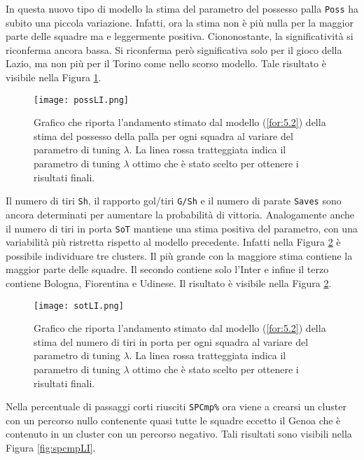 In questa nuovo tipo di modello la stima del parametro del possesso palla \texttt{Poss} ha subito una piccola variazione. Infatti, ora la stima non è più nulla per la maggior parte delle squadre ma e leggermente positiva. Ciononostante, la significatività si riconferma ancora bassa. Si riconferma però significativa solo per il gioco della Lazio, ma non più per il Torino come nello scorso modello. Tale risultato è visibile nella Figura \ref{fig:possLI}.\\
\begin{figure}[]
	\begin{center}
		\texttt{[image: possLI.png]}
		\caption{Grafico che riporta l'andamento stimato dal modello (\ref{for:5.2}) della stima del possesso della palla per ogni squadra al variare del parametro di tuning $\lambda$. La linea rossa tratteggiata indica il parametro di tuning $\lambda$ ottimo che è stato scelto per ottenere i risultati finali.} \label{fig:possLI}
	\end{center}
\end{figure}
Il numero di tiri \texttt{Sh}, il rapporto gol/tiri \texttt{G/Sh} e il numero di parate \texttt{Saves} sono ancora determinati per aumentare la probabilità di vittoria. Analogamente anche il numero di tiri in porta \texttt{SoT} mantiene una stima positiva del parametro, con una variabilità più ristretta rispetto al modello precedente. Infatti nella Figura \ref{fig:sotLI} è possibile individuare tre clusters. Il più grande con la maggiore stima contiene la maggior parte delle squadre. Il secondo contiene solo l'Inter e infine il terzo contiene Bologna, Fiorentina e Udinese. Il risultato è visibile nella Figura \ref{fig:sotLI}.\\
\begin{figure}[htbp]
	\begin{center}
		\texttt{[image: sotLI.png]}
		\caption{Grafico che riporta l'andamento stimato dal modello (\ref{for:5.2}) della stima del numero di tiri in porta per ogni squadra al variare del parametro di tuning $\lambda$. La linea rossa tratteggiata indica il parametro di tuning $\lambda$ ottimo che è stato scelto per ottenere i risultati finali.} \label{fig:sotLI}
	\end{center}
\end{figure}
Nella percentuale di passaggi corti riusciti \texttt{SPCmp\%} ora viene a crearsi un cluster con un percorso nullo contenente quasi tutte le squadre eccetto il Genoa che è contenuto in un cluster con un percorso negativo. Tali risultati sono visibili nella Figura \ref{fig:spcmpLI}.\\
